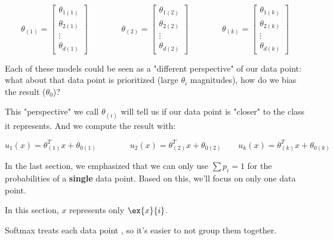         \begin{equation}
            \theta_{(1)} = 
            \begin{bmatrix}
                \theta_{1(1)} \\ \theta_{2(1)} \\ \vdots \\ \theta_{d(1)}
            \end{bmatrix}
            \qquad\qquad
            \theta_{(2)} = 
            \begin{bmatrix}
                \theta_{1(2)} \\ \theta_{2(2)} \\ \vdots \\ \theta_{d(2)}
            \end{bmatrix}
            \qquad\qquad
            \theta_{(k)} = 
            \begin{bmatrix}
                \theta_{1(k)} \\ \theta_{2(k)} \\ \vdots \\ \theta_{d(k)}
            \end{bmatrix}
        \end{equation}
        
        Each of these models could be seen as a "different perspective" of our data point: what about that data point is prioritized (large $\theta_i$ magnitudes), how do we bias the result ($\theta_0$)?
        
        This "perspective" we call $\theta_{(i)}$ will tell us if our data point is "closer" to the class it represents. And we compute the result with:
        
        \begin{equation}
            u_1(x) = \theta_{(1)}^T x + \theta_{0(1)}
            \qquad\qquad
            u_2(x) = \theta_{(2)}^T x + \theta_{0(2)}
            \quad \quad
            u_k(x) = \theta_{(k)}^T x + \theta_{0(k)}
        \end{equation}

        In the last section, we emphasized that we can only use $\sum p_i=1$ for the probabilities of a \textbf{single} data point. Based on this, we'll focus on only one data point.\\

        \begin{clarification}
            In this section, $x$ represents only  $\ex{x}{i}$.

            Softmax treats each data point , so it's easier to not group them together. 
        \end{clarification}
        
